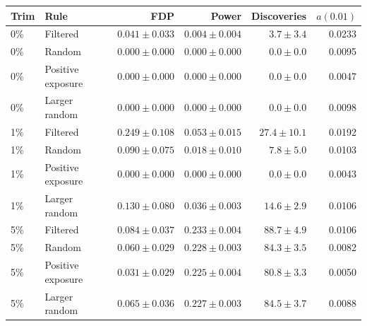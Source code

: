 \begin{tabular}{llrrrr}\toprule Trim & Rule & FDP & Power & Discoveries & $a(0.01)$\\\midrule
0\% & Filtered & $0.041\pm0.033$ & $0.004\pm0.004$ & $3.7\pm3.4$ & 0.0233 \\
0\% & Random & $0.000\pm0.000$ & $0.000\pm0.000$ & $0.0\pm0.0$ & 0.0095 \\
0\% & Positive exposure & $0.000\pm0.000$ & $0.000\pm0.000$ & $0.0\pm0.0$ & 0.0047 \\
0\% & Larger random & $0.000\pm0.000$ & $0.000\pm0.000$ & $0.0\pm0.0$ & 0.0098 \\
1\% & Filtered & $0.249\pm0.108$ & $0.053\pm0.015$ & $27.4\pm10.1$ & 0.0192 \\
1\% & Random & $0.090\pm0.075$ & $0.018\pm0.010$ & $7.8\pm5.0$ & 0.0103 \\
1\% & Positive exposure & $0.000\pm0.000$ & $0.000\pm0.000$ & $0.0\pm0.0$ & 0.0043 \\
1\% & Larger random & $0.130\pm0.080$ & $0.036\pm0.003$ & $14.6\pm2.9$ & 0.0106 \\
5\% & Filtered & $0.084\pm0.037$ & $0.233\pm0.004$ & $88.7\pm4.9$ & 0.0106 \\
5\% & Random & $0.060\pm0.029$ & $0.228\pm0.003$ & $84.3\pm3.5$ & 0.0082 \\
5\% & Positive exposure & $0.031\pm0.029$ & $0.225\pm0.004$ & $80.8\pm3.3$ & 0.0050 \\
5\% & Larger random & $0.065\pm0.036$ & $0.227\pm0.003$ & $84.5\pm3.7$ & 0.0088 \\
\bottomrule\end{tabular}
